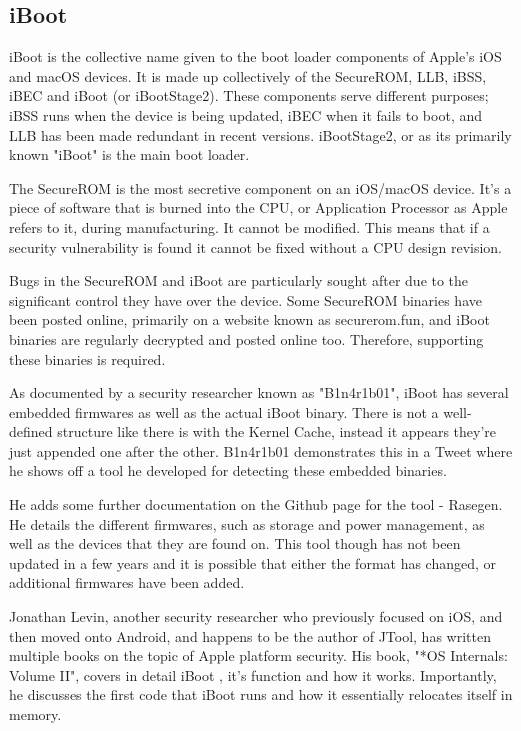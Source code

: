 \subsection{iBoot}


iBoot is the collective name given to the boot loader components of Apple's iOS and macOS devices\cite{levin-newosxbook-iboot}. It is made up collectively of the SecureROM, LLB, iBSS, iBEC and iBoot (or iBootStage2). These components serve different purposes; iBSS runs when the device is being updated, iBEC when it fails to boot, and LLB has been made redundant in recent versions. iBootStage2, or as its primarily known "iBoot" is the main boot loader.

The SecureROM is the most secretive component on an iOS/macOS device. It's a piece of software that is burned into the CPU, or Application Processor as Apple refers to it, during manufacturing. It cannot be modified. This means that if a security vulnerability is found it cannot be fixed without a CPU design revision.

Bugs in the SecureROM and iBoot are particularly sought after due to the significant control they have over the device. Some SecureROM binaries have been posted online, primarily on a website known as securerom.fun, and iBoot binaries are regularly decrypted and posted online too. Therefore, supporting these binaries is required. 



As documented by a security researcher known as "B1n4r1b01", iBoot has several embedded firmwares as well as the actual iBoot binary. There is not a well-defined structure like there is with the Kernel Cache, instead it appears they're just appended one after the other. B1n4r1b01 demonstrates this in a Tweet where he shows off a tool he developed for detecting these embedded binaries\cite{binaryboy-iboot-tweet}.

He adds some further documentation on the Github page for the tool - Rasegen. He details the different firmwares, such as storage and power management, as well as the devices that they are found on. This tool though has not been updated in a few years and it is possible that either the format has changed, or additional firmwares have been added. 

Jonathan Levin, another security researcher who previously focused on iOS, and then moved onto Android, and happens to be the author of JTool, has written multiple books on the topic of Apple platform security. His book, "*OS Internals: Volume II", covers in detail iBoot \cite{levin-newosxbook-iboot} , it's function and how it works. Importantly, he discusses the first code that iBoot runs and how it essentially relocates itself in memory. 



